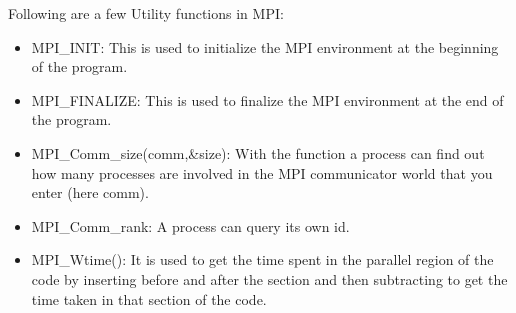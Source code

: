\documentclass[12pt]{article}
\begin{document}
Following are a few Utility functions in MPI:
\begin{itemize}
    \item MPI\_INIT: This is used to initialize the MPI environment at the beginning of the program.
    \item MPI\_FINALIZE: This is used to finalize the MPI environment at the end of the program.
    \item MPI\_Comm\_size(comm,\&size): With the function a process can find out how many processes are involved in the MPI communicator world that you enter (here comm).
    \item MPI\_Comm\_rank: A process can query its own id.
    \item MPI\_Wtime(): It is used to get the time spent in the parallel region of the code by inserting before and after the section and then subtracting to get the time taken in that section of the code.
\end{itemize}
\end{document}
